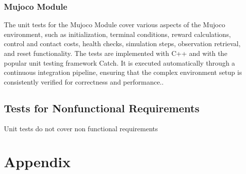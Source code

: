 \documentclass[12pt, titlepage]{article}
\begin{document}
					
					



    


\subsubsection{Mujoco Module}
The unit tests for the Mujoco Module cover various aspects of the Mujoco environment, such as initialization, terminal conditions, reward calculations, control and contact costs, health checks, simulation steps, observation retrieval, and reset functionality. The tests are implemented with C++ and with the popular unit testing framework Catch. It is executed automatically through a continuous integration pipeline, ensuring that the complex environment setup is consistently verified for correctness and performance..


\subsection{Tests for Nonfunctional Requirements}
Unit tests do not cover non functional requirements




				




\newpage

\section{Appendix}

\end{document}
